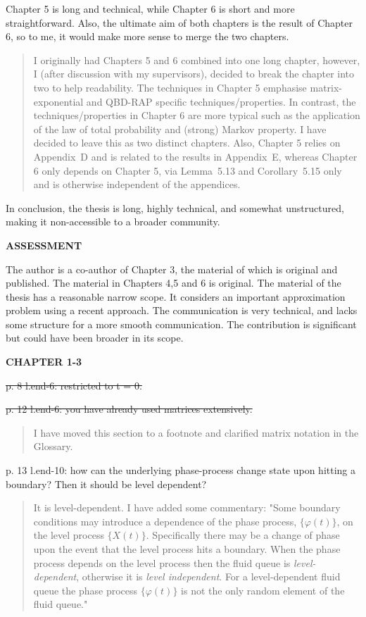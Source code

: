 \documentclass[a4paper]{article}
\begin{document}
Chapter 5 is long and technical, while Chapter 6 is short and more straightforward.
Also, the ultimate aim of both chapters is the result of Chapter 6, so to me, it would
make more sense to merge the two chapters.
\begin{quote}
    I originally had Chapters 5 and 6 combined into one long chapter, however, I (after discussion with my supervisors), decided to break the chapter into two to help readability. The techniques in Chapter 5 emphasise matrix-exponential and QBD-RAP specific techniques/properties. In contrast, the techniques/properties in Chapter 6 are more typical such as the application of the law of total probability and (strong) Markov property. I have decided to leave this as two distinct chapters. Also, Chapter 5 relies on Appendix~D and is related to the results in Appendix~E, whereas Chapter 6 only depends on Chapter 5, via Lemma~5.13 and Corollary~5.15 only and is otherwise independent of the appendices.
\end{quote}

In conclusion, the thesis is long, highly technical, and somewhat unstructured, making it non-accessible to a broader community.

\noindent\textbf{ASSESSMENT}

The author is a co-author of Chapter 3, the material of which is original and published. The material in Chapters 4,5 and 6 is original. The material of the thesis has a
reasonable narrow scope. It considers an important approximation problem using a
recent approach. The communication is very technical, and lacks some structure for
a more smooth communication. The contribution is significant but could have been
broader in its scope.

\noindent\textbf{CHAPTER 1-3}

\st{p. 8 l.end-6: restricted to t = 0.}

\st{p. 12 l.end-6: you have already used matrices extensively.}
\begin{quote}
    I have moved this section to a footnote and clarified matrix notation in the Glossary. 
\end{quote}

p. 13 l.end-10: how can the underlying phase-process change state upon hitting a boundary? Then it should be level dependent?
\begin{quote}
    It is level-dependent. I have added some commentary: "Some boundary conditions may introduce a dependence of the phase process, \(\{\varphi(t)\}\), on the level process \(\{X(t)\}\). Specifically there may be a change of phase upon the event that the level process hits a boundary. When the phase process depends on the level process then the fluid queue is \emph{level-dependent}, otherwise it is \emph{level independent}. For a level-dependent fluid queue the phase process \(\{\varphi(t)\}\) is not the only random element of the fluid queue."
\end{quote}
\end{document}

